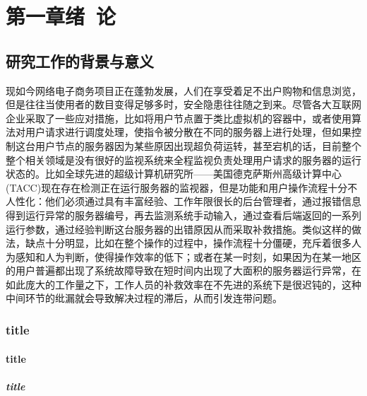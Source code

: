 \section{第一章\quad 绪\ 论}
\subsection{研究工作的背景与意义}
现如今网络电子商务项目正在蓬勃发展，人们在享受着足不出户购物和信息浏览，但是往往当使用者的数目变得足够多时，安全隐患往往随之到来。尽管各大互联网企业采取了一些应对措施，比如将用户节点置于类比虚拟机的容器中，或者使用算法对用户请求进行调度处理，使指令被分散在不同的服务器上进行处理，但如果控制这台用户节点的服务器因为某些原因出现超负荷运转，甚至宕机的话，目前整个整个相关领域是没有很好的监视系统来全程监视负责处理用户请求的服务器的运行状态的。比如全球先进的超级计算机研究所——美国德克萨斯州高级计算中心(TACC)现在存在检测正在运行服务器的监视器，但是功能和用户操作流程十分不人性化：他们必须通过具有丰富经验、工作年限很长的后台管理者，通过报错信息得到运行异常的服务器编号，再去监测系统手动输入，通过查看后端返回的一系列运行参数，通过经验判断这台服务器的出错原因从而采取补救措施。类似这样的做法，缺点十分明显，比如在整个操作的过程中，操作流程十分僵硬，充斥着很多人为感知和人为判断，使得操作效率的低下；或者在某一时刻，如果因为在某一地区的用户普遍都出现了系统故障导致在短时间内出现了大面积的服务器运行异常，在如此庞大的工作量之下，工作人员的补救效率在不先进的系统下是很迟钝的，这种中间环节的纰漏就会导致解决过程的滞后，从而引发连带问题。

\subsubsection{title}
\paragraph{title}
\subparagraph{title}